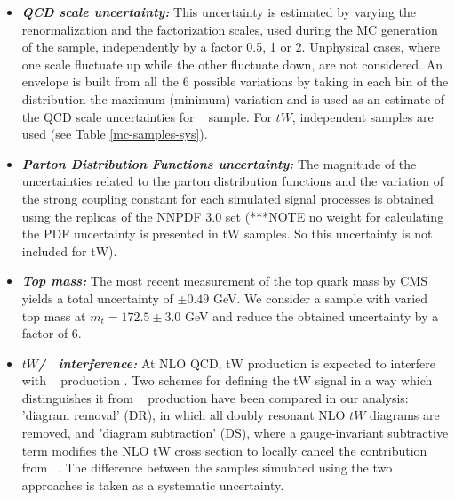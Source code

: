 \begin{itemize}
  \item {\textit{\textbf{QCD scale uncertainty:}} This uncertainty is estimated by varying the renormalization and the factorization scales, used during the MC generation of the sample, independently by a factor 0.5, 1 or 2. Unphysical cases, where one scale fluctuate up while the other fluctuate down, are not considered. An envelope is built from all the 6 possible variations by taking in each bin of the distribution the maximum (minimum) variation and is used as an estimate of the QCD scale uncertainties for \ttbar~ sample. For $tW$, independent samples are used (see Table \ref{mc-samples-sys}).}
  \item {\textit{\textbf{Parton Distribution Functions uncertainty:}} The magnitude of the uncertainties related to the parton distribution functions and the variation of the strong coupling constant for each simulated signal processes is obtained using the replicas of the NNPDF 3.0 set (***NOTE no weight for calculating the PDF uncertainty is presented in tW samples. So this uncertainty is not included for tW).}
  \item \textit{\textbf{Top mass:}} The most recent measurement of the top quark mass by CMS yields a total uncertainty of $\pm 0.49$  GeV. We consider a sample with varied top mass at  $m_t=172.5\pm3.0$  GeV and reduce the obtained uncertainty by a factor of 6.
  \item \textit{\textbf{$tW$/\ttbar~ interference:}} At NLO QCD, tW production is expected to interfere with \ttbar~ production \cite{Demartin:2016axk}. Two schemes for defining the tW signal in a way which distinguishes it from \ttbar~ production have been compared in our analysis: 'diagram removal' (DR), in which all
doubly resonant NLO $tW$ diagrams are removed,  and 'diagram subtraction' (DS), where a gauge-invariant subtractive term modifies the NLO tW cross section to locally cancel the contribution from \ttbar~. The difference between the samples simulated using the two approaches is taken as a systematic uncertainty.

\end{itemize}
